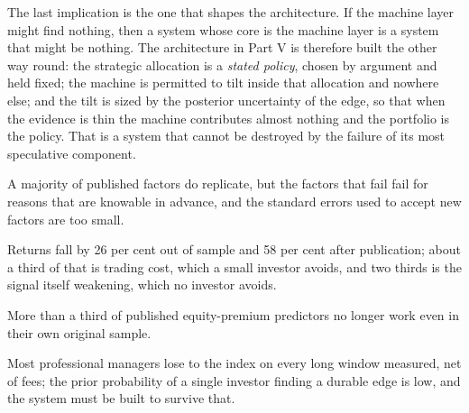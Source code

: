 The last implication is the one that shapes the architecture. If the machine
layer might find nothing, then a system whose core is the machine layer is
a system that might be nothing. The architecture in Part V is therefore
built the other way round: the strategic allocation is a \emph{stated policy},
chosen by argument and held fixed; the machine is permitted to tilt inside
that allocation and nowhere else; and the tilt is sized by the posterior
uncertainty of the edge, so that when the evidence is thin the machine
contributes almost nothing and the portfolio is the policy. That is a
system that cannot be destroyed by the failure of its most speculative
component.

\begin{keytakeaways}
\item A majority of published factors do replicate, but the factors that
fail fail for reasons that are knowable in advance, and the standard errors
used to accept new factors are too small.
\item Returns fall by 26 per cent out of sample and 58 per cent after
publication; about a third of that is trading cost, which a small
investor avoids, and two thirds is the signal itself weakening, which no
investor avoids.
\item More than a third of published equity-premium predictors no longer
work even in their own original sample.
\item Most professional managers lose to the index on every long window
measured, net of fees; the prior probability of a single investor finding a
durable edge is low, and the system must be built to survive that.
\end{keytakeaways}
